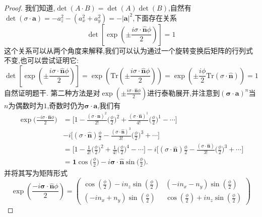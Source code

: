 \begin{enumerate}
\begin{proof}
		我们知道,$\det(A\cdot B)=\det(A)\det(B)$,自然有$\det(\sigma\cdot\textbf{a})=-a_z^2-(a_x^2+a_y^2)=-|\textbf{a}|^2$,下面存在关系
		\begin{equation}
			\det\left[\exp\left(\pm\frac{i\sigma\cdot\hat{\mathbf{n}}\phi}{2}\right)\right]=1
		\end{equation}
		这个关系可以从两个角度来解释,我们可以认为通过一个旋转变换后矩阵的行列式不变,也可以尝试证明它:
		\begin{equation}
			\det\left[\exp\left(\pm\frac{i\sigma\cdot\hat{\mathbf{n}}\phi}{2}\right)\right]=\exp\left(\mathrm{Tr}\left(\pm\frac{i\sigma\cdot\hat{\mathbf{n}}\phi}{2}\right)\right)=\exp\left(\pm\frac{i\phi}2 \mathrm{Tr}\left(\sigma\cdot\hat{\mathbf{n}}\right)\right)=1
		\end{equation}
		自然证明题干.
		第二种方法是对$\exp\left(\pm\frac{i\sigma\cdot\hat{\mathbf{n}}\phi}{2}\right)$进行泰勒展开,并注意到$(\mathbf{\sigma } \cdot \mathbf{a})^n$当$n$为偶数时为$1$,奇数时仍为$\mathbf{\sigma } \cdot \mathbf{a}$,我们有
		\begin{equation}
			\begin{aligned}
				\exp\biggl({\frac{-i\sigma\cdot{\hat{\mathbf{n}}}\phi}{2}}\biggr)& = \Big[ 1-\frac{(\sigma\cdot\hat{\mathbf{n}})^{2}}{2 !}\Big(\frac{\phi}{2}\Big)^{2}+\frac{(\sigma\cdot\hat{\mathbf{n}})^{1}}{4 !}\Big(\frac{\phi}{2}\Big)^{1}-\cdots\Big] \\
				&-i\Big[(\sigma\cdot\hat{\mathbf{n}}) \frac{\phi}{2}-\frac{(\sigma\cdot\hat{\mathbf{n}})^{3}}{3!}\Big(\frac{\phi}{2}\Big)^{3}+\cdots\Big] \\
				&=\Big[ 1-\frac{1}{2 !}\Big(\frac{\phi}{2}\Big)^{2}+\frac{1}{4 !}\Big(\frac{\phi}{2}\Big)^{4}-\cdots\Big]-i\Big[(\sigma\cdot\hat{\mathbf{n}}) \frac{\phi}{2}-\frac{(\sigma\cdot\hat{\mathbf{n}})}{3!}\Big(\frac{\phi}{2}\Big)^{3}+\cdots\Big]\\
				&= \mathbf{1}\cos\biggl(\frac{\phi}{2}\biggr) - i\mathbf{\sigma} \cdot \mathbf{\hat{n}}\sin\biggl(\frac{\phi}{2}\biggr).
			\end{aligned}
		\end{equation}
		并将其写为矩阵形式
		\begin{equation}
			\exp\left(\frac{-i\boldsymbol{\sigma}\cdot\hat{\mathbf{n}}\phi}2\right)=
			\begin{pmatrix}
				\cos\left(\frac\phi2\right)-in_z\sin\left(\frac\phi2\right)&(-in_x-n_y)\sin\left(\frac\phi2\right)\\(-in_x+n_y)\sin\left(\frac\phi2\right)&\cos\left(\frac\phi2\right)+in_z\sin\left(\frac\phi2\right)
			\end{pmatrix}

\end{equation}
\end{proof}
\end{enumerate}

